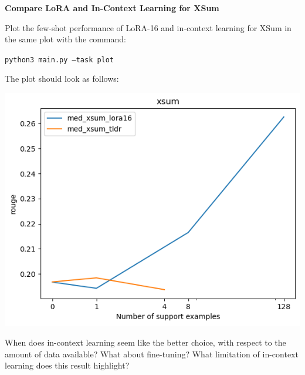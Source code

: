 \item {} {\bf Compare LoRA and In-Context Learning for XSum}

Plot the few-shot performance of LoRA-16 and in-context learning for XSum in the same plot with the command:

{\small\texttt{python3 main.py --task plot}}

The plot should look as follows:
\begin{center}
    \includegraphics[width=0.75\linewidth]{./figures/q4_plot}
\end{center}

When does in-context learning seem like the better choice, with respect to the amount of data available? What about fine-tuning? What limitation of in-context learning does this result highlight?